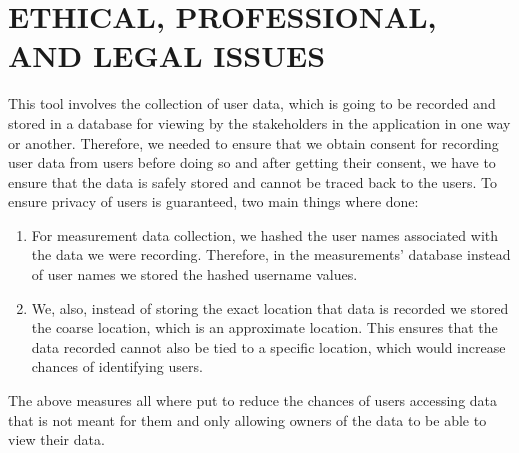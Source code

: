 \section{ETHICAL, PROFESSIONAL, AND LEGAL ISSUES}\label{sec:ethical,-professional,-and-legal-issues}
This tool involves the collection of user data, which is going to be recorded and stored in a database for viewing by the stakeholders in the application in one way or another.
Therefore, we needed to ensure that we obtain consent for recording user data from users before doing so and after getting their consent, we have to ensure that the data is safely stored and cannot be traced back to the users.
To ensure privacy of users is guaranteed, two main things where done:
\begin{enumerate}
    \item For measurement data collection, we hashed the user names associated with the data we were recording.
    Therefore, in the measurements' database instead of user names we stored the hashed username values.
    \item We, also, instead of storing the exact location that data is recorded we stored the coarse location, which is an approximate location.
    This ensures that the data recorded cannot also be tied to a specific location, which would increase chances of identifying users.
\end{enumerate}
The above measures all where put to reduce the chances of users accessing data that is not meant for them and only allowing owners of the data to be able to view their data.